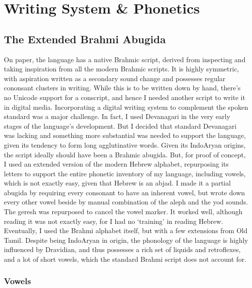 \documentclass[14pt,oneside]{book}
\begin{document}
\chapter{Writing System \& Phonetics}



\section{The Extended Brahmi Abugida}

On paper, the language has a native Brahmic script, derived from inspecting and taking inspiration from all the modern Brahmic scripts. It is highly symmetric, with aspiration written as a secondary sound change and possesses regular cononsant clusters in writing. While this is to be written down by hand, there's no Unicode support for a conscript, and hence I needed another script to write it in digital media. \noindent Incorporating a digital writing system to complement the spoken standard was a major challenge. In fact, I used Devanagari in the very early stages of the language's development. But I decided that standard Devanagari was lacking and something more substantial was needed to support the language, given its tendency to form long agglutinative words. Given its Indo{\textendash}Aryan origins, the script ideally should have been a Brahmic abugida. But, for proof of concept, I used an extended version of the modern Hebrew alphabet, repurposing its letters to support the entire phonetic inventory of my language, including vowels, which is not exactly easy, given that Hebrew is an abjad. I made it a partial abugida by requiring every consonant to have an inherent vowel, but wrote down every other vowel beside by manual combination of the aleph and the yod sounds. The geresh was repurposed to cancel the vowel marker. It worked well, although reading it was not exactly easy, for I had no `training' in reading Hebrew. Eventually, I used the Brahmi alphabet itself, but with a few extensions from Old Tamil. Despite being Indo{\textendash}Aryan in origin, the phonology of the language is highly influenced by Dravidian, and thus possesses a rich set of liquids and retroflexes, and a lot of short vowels, which the standard Brahmi script does not account for.


\subsection{Vowels}
\end{document}

